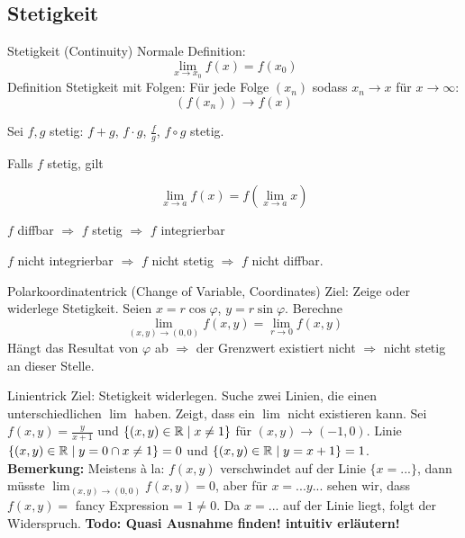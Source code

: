 \subsection{Stetigkeit}

\begin{Definition}{Stetigkeit (Continuity)}{}
    Normale Definition:
    \[
    \lim_{x\rightarrow x_0} f(x) = f(x_0)
    \]
    Definition Stetigkeit mit Folgen: Für jede Folge $(x_n)$ sodass $x_n \rightarrow x$ für $x\rightarrow \infty $:
    \[
    (f(x_n)) \rightarrow f(x)
    \]
\end{Definition}

Sei $f,g$ stetig: $f+g$, $f\cdot g$, $\frac{f}{g}$, $f \circ g$ stetig.

Falls $f$ stetig, gilt

\[
    \lim_{x \rightarrow a} f(x) = f(\lim_{x\rightarrow a} x)
\]

$f$ diffbar $\Rightarrow$ $f$ stetig $\Rightarrow$ $f$ integrierbar

$f$ nicht integrierbar $\Rightarrow$ $f$ nicht stetig $\Rightarrow$ $f$ nicht diffbar.\\

\begin{Rezept}{Polarkoordinatentrick (Change of Variable, Coordinates)}{}
    Ziel: Zeige oder widerlege Stetigkeit. Seien $x=r\cos \varphi$, $y=r\sin \varphi$. Berechne
    \[
    \lim_{(x, y) \rightarrow (0,0)} f(x, y) = \lim_{r \rightarrow 0} f(x, y)
    \]
    Hängt das Resultat von $\varphi$ ab $\Rightarrow$ der Grenzwert existiert nicht $\Rightarrow$ nicht stetig an dieser Stelle.
\end{Rezept}

\begin{Rezept}{Linientrick}{}
    Ziel: Stetigkeit widerlegen. Suche zwei Linien, die einen unterschiedlichen $\lim$ haben. Zeigt, dass ein $\lim$ nicht existieren kann.
    Sei $f(x, y)=\frac{y}{x+1}$ und $\{(x, y) \in \mathbb{R} \mid x \neq 1\}$ für $(x, y) \rightarrow (-1, 0)$. Linie $\{(x, y) \in \mathbb{R} \mid y=0\cap x \neq 1\}=0$ und $\{(x, y) \in \mathbb{R} \mid y=x+1\}=1$.\\
    
    \textbf{Bemerkung:} Meistens à la: $f(x,y)$ verschwindet auf der Linie $\{x=...\}$, dann müsste $\lim_{(x,y)\rightarrow(0,0)} f(x,y) = 0$, aber für $x=...y...$ sehen wir, dass
    $f(x,y) =$ fancy Expression = $1 \neq 0$. Da $x=...$ auf der Linie liegt, folgt der Widerspruch. \textbf{Todo: Quasi Ausnahme finden! intuitiv erläutern!}
\end{Rezept}

